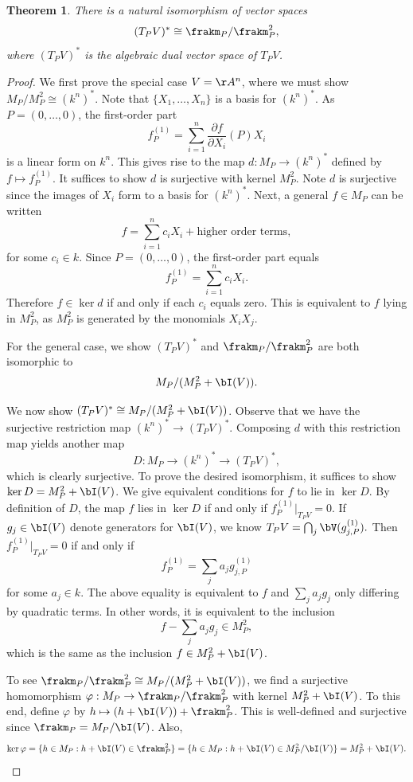 \documentclass[12pt]{amsart}
\theoremstyle{plain}
\newtheorem{theorem}{Theorem}[subsection]
\begin{document}
\begin{theorem}
There is a natural isomorphism of vector spaces
$$(T_PV)^* \cong \frakm_P/\frakm_P^2,$$
where $(T_PV)^*$ is the algebraic dual vector space of $T_PV$.
\end{theorem}
\begin{proof}
We first prove the special case $V=\AA^n$, where we must show $M_P/M_P^2\cong(k^n)^*$.
Note that $\{X_1, \ldots, X_n\}$ is a basis for $(k^n)^*$.
As $P=(0, \ldots, 0)$, the first-order part
$$f_P^{(1)}=\sum_{i=1}^n \frac{\partial f}{\partial X_i}(P) X_i$$
is a linear form on $k^n$.
This gives rise to the map $d : M_P\to(k^n)^*$ defined by $f \mapsto f_P^{(1)}$.
It suffices to show $d$ is surjective with kernel $M_P^2$.
Note $d$ is surjective since the images of $X_i$ form to a basis for $(k^n)^*$.
Next, a general $f \in M_P$ can be written
$$f=\sum_{i=1}^n c_i X_i + \text{higher order terms},$$
for some $c_i \in k$.
Since $P=(0,\ldots,0)$, the first-order part equals
$$f_P^{(1)} = \sum_{i=1}^n c_i X_i.$$
Therefore $f \in \ker d$ if and only if each $c_i$ equals zero.
This is equivalent to $f$ lying in $M_P^2$, as $M_P^2$ is generated by the monomials $X_i X_j$.

For the general case, we show $(T_PV)^*$ and $\frakm_P/\frakm_P^2$ are both isomorphic to
$$M_P/(M_P^2+\bI(V)).$$

We now show $(T_PV)^* \cong M_P/(M_P^2+\bI(V))$.
Observe that we have the surjective restriction map $(k^n)^* \to (T_PV)^*$.
Composing $d$ with this restriction map yields another map
$$D:M_P \to (k^n)^* \to (T_PV)^*,$$
which is clearly surjective.
To prove the desired isomorphism, it suffices to show $\ker D = M_P^2+\bI(V)$.
We give equivalent conditions for $f$ to lie in $\ker D$.
By definition of $D$, the map $f$ lies in $\ker D$ if and only if $f_P^{(1)} \big|_{T_PV} = 0$.
If $g_j \in \bI(V)$ denote generators for $\bI(V)$, we know $T_PV = \bigcap_j \bV(g_{j,P}^{(1)}).$
Then $f_P^{(1)} \big|_{T_PV}=0$ if and only if 
$$f_P^{(1)} = \sum_j a_j g_{j,P}^{(1)}$$
for some $a_j \in k$.
The above equality is equivalent to $f$ and $\sum_j a_j g_j$ only differing by quadratic terms.
In other words, it is equivalent to the inclusion
$$f - \sum_j a_j g_j \in M_P^2,$$
which is the same as the inclusion $f \in M_P^2 + \bI(V)$.

To see $\frakm_P/\frakm_P^2 \cong M_P/(M_P^2+\bI(V))$, we find a surjective homomorphism $\varphi : M_P \to \frakm_P/\frakm_P^2$ with kernel $M_P^2+\bI(V)$. 
To this end, define $\varphi$ by $h \mapsto (h+\bI(V)) + \frakm_P^2$.
This is well-defined and surjective since $\frakm_P=M_P/\bI(V)$.
Also,
$$\ker \varphi = \{h \in M_P : h + \bI(V) \in \frakm_P^2\}=\{h \in M_P:h+\bI(V)\in M_P^2/\bI(V)\}=M_P^2+\bI(V).$$
\end{proof}
\end{document}
